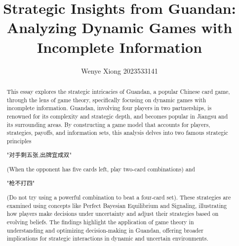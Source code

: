 \documentclass{article}
\author{Wenye Xiong 2023533141}
\title{Strategic Insights from Guandan: Analyzing Dynamic Games with Incomplete Information}
\begin{document}
\maketitle
\begin{abstract}
    This essay explores the strategic intricacies of Guandan, a popular Chinese card game, through the lens of game theory, specifically focusing on dynamic games with incomplete information. 
    Guandan, involving four players in two partnerships, is renowned for its complexity and strategic depth, 
    and becomes popular in Jiangsu and its surrounding areas. By constructing a game model that accounts for players, strategies, payoffs, and information sets, 
    this analysis delves into two famous strategic principles 
    \begin{CJK*}{UTF8}{gbsn}"对手剩五张,出牌宜成双" \end{CJK*}
    (When the opponent has five cards left, play two-card combinations) and 
    \begin{CJK*}{UTF8}{gbsn}"枪不打四"  \end{CJK*}
    (Do not try using a powerful combination to beat a four-card set). 
    These strategies are examined using concepts like Perfect Bayesian Equilibrium and Signaling, 
    illustrating how players make decisions under uncertainty and adjust their strategies based on evolving beliefs. 
    The findings highlight the application of game theory in understanding and optimizing decision-making in Guandan, 
    offering broader implications for strategic interactions in dynamic and uncertain environments.
\end{abstract}
\end{document}
